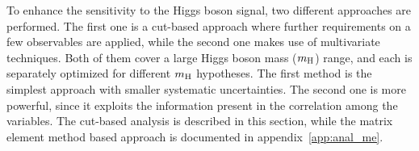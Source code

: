To enhance the sensitivity to the Higgs boson signal, two different approaches 
are performed. The first one is a cut-based approach where further requirements 
on a few observables are applied, while the second one makes use of
multivariate techniques. Both of them cover a large Higgs boson mass
($m_{\rm{H}}$) range, and each is separately optimized for different
$m_{\rm{H}}$ hypotheses. The first method is the simplest approach with smaller
systematic uncertainties. The second one is
more powerful, since it exploits the information present in the
correlation among the variables. 
The cut-based analysis is described in this section, while the matrix element 
method based approach is documented in appendix~\ref{app:anal_me}. 








